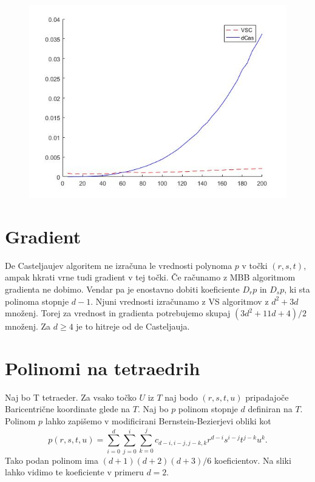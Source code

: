 \documentclass{article}
\begin{document}
 \begin{figure}[h]
\centering
\begin{minipage}{.5\textwidth}
\centering
 \includegraphics[scale=0.3]{vsc}
\label{fig:vsc}
\end{minipage}
\end{figure}


 \newpage
\section{Gradient}
De Casteljaujev algoritem ne izračuna le vrednosti polynoma $p$ v točki $(r,s,t)$, ampak hkrati vrne tudi gradient v tej točki. Če računamo z MBB algoritmom gradienta ne dobimo. Vendar pa je enostavno dobiti koeficiente $D_rp$ in $D_sp$, ki sta polinoma stopnje $d-1$. Njuni vrednosti izračunamo z VS algoritmov z $d^2 + 3d$ množenj. Torej za vrednost in gradienta potrebujemo skupaj $(3d^2 + 11d + 4)/2$ množenj. Za $d\geq4$ je to hitreje od de Casteljauja. 


\section{Polinomi na tetraedrih}

Naj bo T tetraeder. Za vsako točko $U$ iz $T$ naj bodo $(r,s,t,u)$ pripadajoče Baricentrične koordinate glede na $T$.  Naj bo $p$ polinom stopnje $d$ definiran na $T$. Polinom $p$ lahko zapišemo v modificirani Bernstein-Bezierjevi obliki kot 
$$p(r,s,t,u) = \sum_{i = 0}^d{\sum_{j=0}^{i}{\sum_{k = 0}^{j}{c_{d-i,i-j,j-k,k} r^{d-i} s^{i-j} t^{j-k} u^k}}}.$$
Tako podan polinom ima $(d+1)(d+2)(d+3)/6$ koeficientov. Na sliki lahko vidimo te koeficiente v primeru $d=2$.
\end{document}
